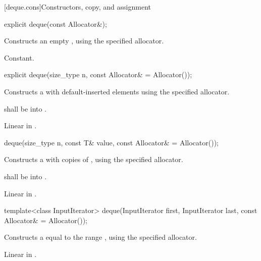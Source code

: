 [deque.cons]{Constructors, copy, and assignment}

%
\begin{itemdecl}
explicit deque(const Allocator&);
\end{itemdecl}

\begin{itemdescr}
\pnum
\effects
Constructs an empty
,
using the specified allocator.

\pnum
\complexity
Constant.
\end{itemdescr}

%
\begin{itemdecl}
explicit deque(size_type n, const Allocator& = Allocator());
\end{itemdecl}

\begin{itemdescr}
\pnum
\effects Constructs a  with
 default-inserted elements using the specified allocator.

\pnum
\requires {} shall be  into .

\pnum
\complexity Linear in .
\end{itemdescr}

%
\begin{itemdecl}
deque(size_type n, const T& value, const Allocator& = Allocator());
\end{itemdecl}

\begin{itemdescr}
\pnum
\effects
Constructs a
with  copies of ,
using the specified allocator.

\pnum
\requires {} shall be  into .

\pnum
\complexity
Linear in .
\end{itemdescr}

%
\begin{itemdecl}
template<class InputIterator>
  deque(InputIterator first, InputIterator last, const Allocator& = Allocator());
\end{itemdecl}

\begin{itemdescr}
\pnum
\effects
Constructs a
equal to the range
,
using the specified allocator.

\pnum
\complexity Linear in .
\end{itemdescr}

